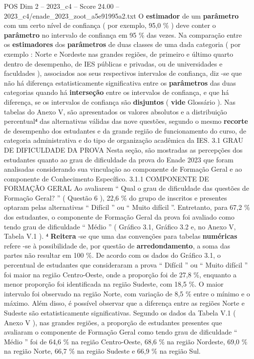\begin{textsample}{POS Dim 2 – 2023\_c4 – Score 24.00 – 2023\_c4/enade\_2023\_zoot\_a5e91995a2.txt}
O \textbf{estimador} de um \textbf{parâmetro} com um certo nível de confiança ( por exemplo, 95,0 \% ) deve conter o \textbf{parâmetro} no intervalo de confiança em 95 \% das vezes.
Na comparação entre os \textbf{estimadores} dos \textbf{parâmetros} de duas classes de uma dada categoria ( por exemplo : Norte e Nordeste nas grandes regiões, de primeiro e último quarto dentro de desempenho, de IES públicas e privadas, ou de universidades e faculdades ), associados aos seus respectivos intervalos de confiança, diz -se que não há diferença estatisticamente significativa entre os \textbf{parâmetros} das duas categorias quando há \textbf{interseção} entre os intervalos de confiança, e que há diferença, se os intervalos de confiança são \textbf{disjuntos} ( \textbf{vide} Glossário ).
Nas tabelas do Anexo V, são apresentados os valores absolutos e a distribuição percentual⁴ das alternativas válidas das nove questões, segundo o mesmo \textbf{recorte} de desempenho dos estudantes e da grande região de funcionamento do curso, de categoria administrativa e do tipo de organização acadêmica da IES. 3.1 GRAU DE DIFICULDADE DA PROVA Nesta seção, são mostradas as percepções dos estudantes quanto ao grau de dificuldade da prova do Enade 2023 que foram analisadas considerando sua vinculação ao componente de Formação Geral e ao componente de Conhecimento Específico. 3.1.1 COMPONENTE DE FORMAÇÃO GERAL Ao avaliarem “ Qual o grau de dificuldade das questões de Formação Geral? ” ( Questão 6 ), 22,6 \% do grupo de inscritos e presentes optaram pelas alternativas “ Difícil ” ou “ Muito difícil ”.
Entretanto, para 67,2 \% dos estudantes, o componente de Formação Geral da prova foi avaliado como tendo grau de dificuldade “ Médio ” ( Gráfico 3.1, Gráfico 3.2 e, no Anexo V, Tabela V.1 ). ⁴ \textbf{Reitera} -se que uma das convenções para tabelas \textbf{numéricas} refere -se à possibilidade de, por questão de \textbf{arredondamento}, a soma das partes não resultar em 100 \%.
De acordo com os dados do Gráfico 3.1, o percentual de estudantes que consideraram a prova “ Difícil ” ou “ Muito difícil ” foi maior na região Centro-Oeste, onde a proporção foi de 27,8 \%, enquanto a menor proporção foi identificada na região Sudeste, com 18,5 \%.
O maior intervalo foi observado na região Norte, com variação de 8,5 \% entre o mínimo e o máximo.
Além disso, é possível observar que a diferença entre as regiões Norte e Sudeste são estatisticamente significativas.
Segundo os dados da Tabela V.1 ( Anexo V ), nas grandes regiões, a proporção de estudantes presentes que avaliaram o componente de Formação Geral como tendo grau de dificuldade “ Médio ” foi de 64,6 \% na região Centro-Oeste, 68,6 \% na região Nordeste, 69,0 \% na região Norte, 66,7 \% na região Sudeste e 66,9 \% na região Sul.

\end{textsample}
